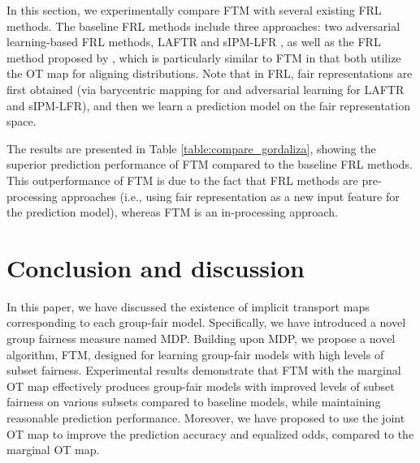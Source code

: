 \documentclass[10pt]{article} %
\begin{document}
In this section, we experimentally compare FTM with several existing FRL methods.
The baseline FRL methods include three approaches: two adversarial learning-based FRL methods, LAFTR \citep{Madras2018LearningAF} and sIPM-LFR \citep{pmlr-v162-kim22b}, as well as the FRL method proposed by \citet{pmlr-v97-gordaliza19a}, which is particularly similar to FTM in that both utilize the OT map for aligning distributions.
Note that in FRL, fair representations are first obtained (via barycentric mapping for \citet{pmlr-v97-gordaliza19a} and adversarial learning for LAFTR and sIPM-LFR), and then we learn a prediction model on the fair representation space.

The results are presented in Table \ref{table:compare_gordaliza}, showing the superior prediction performance of FTM compared to the baseline FRL methods.
This outperformance of FTM is due to the fact that FRL methods are pre-processing approaches (i.e., using fair representation as a new input feature for the prediction model), whereas FTM is an in-processing approach.


\section{Conclusion and discussion}
\label{sec:conc}

In this paper, we have discussed the existence of implicit transport maps corresponding to each group-fair model.
Specifically, we have introduced a novel group fairness measure named MDP.
Building upon MDP, we propose a novel algorithm, FTM, designed for learning group-fair models with high levels of subset fairness.
Experimental results demonstrate that FTM with the marginal OT map effectively produces group-fair models with improved levels of subset fairness on various subsets compared to baseline models, while maintaining reasonable prediction performance.
Moreover, we have proposed to use the joint OT map to improve the prediction accuracy and equalized odds, compared to the marginal OT map.
\end{document}
